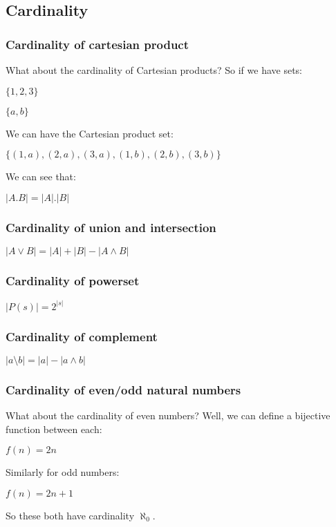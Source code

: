 \subsection{Cardinality}

\subsubsection{Cardinality of cartesian product}

What about the cardinality of Cartesian products? So if we have sets:

\(\{1,2,3\}\)

\(\{a,b\}\)

We can have the Cartesian product set:

\(\{(1,a),(2,a),(3,a),(1,b),(2,b),(3,b)\}\)

We can see that:

\(|A.B|=|A|.|B|\)
\subsubsection{Cardinality of union and intersection}

\(|A\lor B| = |A|+|B|-|A\land B|\)
\subsubsection{Cardinality of powerset}

\(|P(s)|=2^{|s|}\)

\subsubsection{Cardinality of complement}

\(|a \setminus b|=|a|-|a\land b|\)

\subsubsection{Cardinality of even/odd natural numbers}

What about the cardinality of even numbers? Well, we can define a bijective function between each:

\(f(n)=2n\)

Similarly for odd numbers:

\(f(n)=2n+1\)

So these both have cardinality \(\aleph_0\).

